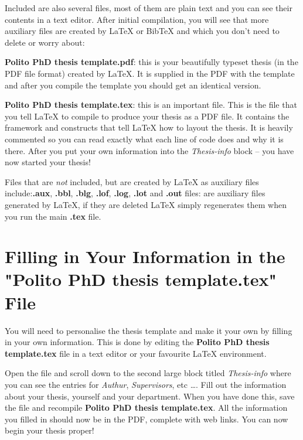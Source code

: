 Included are also several files, most of them are plain text and you can see their contents in a text editor. After initial compilation, you will see that more auxiliary files are created by \LaTeX{} or BibTeX and which you don't need to delete or worry about:

\textbf{Polito PhD thesis template.pdf}: this is your beautifully typeset thesis (in the PDF file format) created by \LaTeX{}. It is supplied in the PDF with the template and after you compile the template you should get an identical version.

\textbf{Polito PhD thesis template.tex}: this is an important file. This is the file that you tell \LaTeX{} to compile to produce your thesis as a PDF file. It contains the framework and constructs that tell \LaTeX{} how to layout the thesis. It is heavily commented so you can read exactly what each line of code does and why it is there. After you put your own information into the \emph{Thesis-info} block -- you have now started your thesis!

Files that are \emph{not} included, but are created by \LaTeX{} as auxiliary files include:\textbf{.aux}, \textbf{.bbl}, \textbf{.blg}, \textbf{.lof}, \textbf{.log}, \textbf{.lot} and \textbf{.out} files: are auxiliary files generated by \LaTeX{}, if they are deleted \LaTeX{} simply regenerates them when you run the main \textbf{.tex} file.


\section{Filling in Your Information in the "Polito PhD thesis template.tex" File}
\label{section 1.4}

You will need to personalise the thesis template and make it your own by filling in your own information. This is done by editing the \textbf{Polito PhD thesis template.tex} file in a text editor or your favourite LaTeX environment.

Open the file and scroll down to the second large block titled \emph{Thesis-info} where you can see the entries for \emph{Authur}, \emph{Supervisors}, etc \ldots. Fill out the information about your thesis, yourself and your department. When you have done this, save the file and recompile \textbf{Polito PhD thesis template.tex}. All the information you filled in should now be in the PDF, complete with web links. You can now begin your thesis proper!

